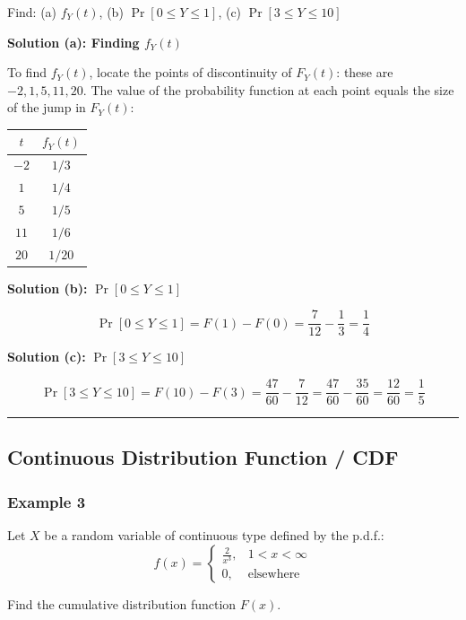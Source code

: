 \documentclass[
]{article}
\begin{document}
Find: (a) \(f_Y(t)\), (b) \(\Pr[0 \leq Y \leq 1]\), (c)
\(\Pr[3 \leq Y \leq 10]\)

\textbf{Solution (a): Finding \(f_Y(t)\)}

To find \(f_Y(t)\), locate the points of discontinuity of \(F_Y(t)\):
these are \(-2, 1, 5, 11, 20\). The value of the probability function at
each point equals the size of the jump in \(F_Y(t)\):

\begin{longtable}[]{@{}cc@{}}
\toprule\noalign{}
\(t\) & \(f_Y(t)\) \\
\midrule\noalign{}
\endhead
\bottomrule\noalign{}
\endlastfoot
\(-2\) & \(1/3\) \\
\(1\) & \(1/4\) \\
\(5\) & \(1/5\) \\
\(11\) & \(1/6\) \\
\(20\) & \(1/20\) \\
\end{longtable}

\textbf{Solution (b):} \(\Pr[0 \leq Y \leq 1]\)

\[\Pr[0 \leq Y \leq 1] = F(1) - F(0) = \frac{7}{12} - \frac{1}{3} = \frac{1}{4}\]

\textbf{Solution (c):} \(\Pr[3 \leq Y \leq 10]\)

\[\Pr[3 \leq Y \leq 10] = F(10) - F(3) = \frac{47}{60} - \frac{7}{12} = \frac{47}{60} - \frac{35}{60} = \frac{12}{60} = \frac{1}{5}\]

\begin{center}\rule{0.5\linewidth}{0.5pt}\end{center}

\subsection{Continuous Distribution Function /
CDF}\label{continuous-distribution-function-cdf}

\subsubsection{Example 3}\label{example-3-2}

Let \(X\) be a random variable of continuous type defined by the p.d.f.:
\[f(x) = \begin{cases} \frac{2}{x^3}, & 1 < x < \infty \\ 0, & \text{elsewhere} \end{cases}\]

Find the cumulative distribution function \(F(x)\).
\end{document}

